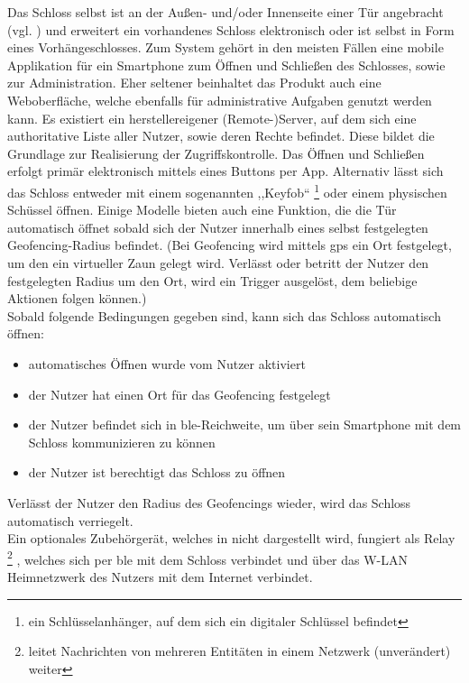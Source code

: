	    \noindent Das Schloss selbst ist an der Außen- und/oder Innenseite einer Tür angebracht (vgl. ) und erweitert ein vorhandenes Schloss elektronisch oder ist selbst in Form eines Vorhängeschlosses\cite{Ho2016}. 
		Zum System gehört in den meisten Fällen eine mobile Applikation für ein Smartphone zum Öffnen und Schließen des Schlosses, sowie zur Administration\cite{Fuller2017}. 
        Eher seltener beinhaltet das Produkt auch eine Weboberfläche, welche ebenfalls für administrative Aufgaben genutzt werden kann\cite{Ho2016}. 
		Es existiert ein herstellereigener (Remote-)Server, auf dem sich eine authoritative Liste aller Nutzer, sowie deren Rechte befindet. 
        Diese bildet die Grundlage zur Realisierung der Zugriffskontrolle.\cite{Fuller2017} 
        Das Öffnen und Schließen erfolgt primär elektronisch mittels eines Buttons per App.
        Alternativ lässt sich das Schloss entweder mit einem sogenannten ,,Keyfob`` 
        \footnote{ein Schlüsselanhänger, auf dem sich ein digitaler Schlüssel befindet} 
        oder einem physischen Schüssel öffnen\cite{Ho2016}. 
        Einige Modelle bieten auch eine Funktion, die die Tür automatisch öffnet sobald sich der Nutzer innerhalb eines selbst festgelegten Geofencing-Radius befindet. 
        (Bei Geofencing wird mittels \gls{gps} ein Ort festgelegt, um den ein virtueller Zaun gelegt wird. 
        Verlässt oder betritt der Nutzer den festgelegten Radius um den Ort, wird ein Trigger ausgelöst, dem beliebige Aktionen folgen können.) 
        \smallskip\\
        \noindent Sobald folgende Bedingungen gegeben sind, kann sich das Schloss automatisch öffnen: 
        \begin{itemize}[noitemsep]
        	\item automatisches Öffnen wurde vom Nutzer aktiviert
        	\item der Nutzer hat einen Ort für das Geofencing festgelegt
        	\item der Nutzer befindet sich in \gls{ble}-Reichweite, um über sein Smartphone mit dem Schloss kommunizieren zu können
        	\item der Nutzer ist berechtigt das Schloss zu öffnen
        \end{itemize}
    	Verlässt der Nutzer den Radius des Geofencings wieder, wird das Schloss automatisch verriegelt. 
    	\smallskip\\
		Ein optionales Zubehörgerät, welches in  nicht dargestellt wird, fungiert als Relay
		\footnote{leitet Nachrichten von mehreren Entitäten in einem Netzwerk (unverändert) weiter}
		, welches sich per \gls{ble} mit dem Schloss verbindet und über das W-LAN Heimnetzwerk des Nutzers mit dem Internet verbindet.
		
